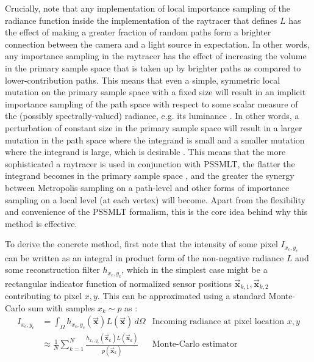 \documentclass[oneside, a4paper]{article}
\newcommand\vek[1]{\vec{\bm{#1}}}
\begin{document}
\begin{highlightblock}
Crucially, note that any implementation of local importance sampling of the radiance function inside the implementation of the raytracer that defines $L$ has the effect of making a greater fraction of random paths form a brighter connection between the camera and a light source in expectation. In other words, any importance sampling in the raytracer has the effect of increasing the volume in the primary sample space that is taken up by brighter paths as compared to lower-contribution paths. This means that even a simple, symmetric local mutation on the primary sample space with a fixed size will result in an implicit importance sampling of the path space with respect to some scalar measure of the (possibly spectrally-valued) radiance, e.g. its luminance \autocite{pssmlt}. In other words, a perturbation of constant size in the primary sample space will result in a larger mutation in the path space where the integrand is small and a smaller mutation where the integrand is large, which is desirable \autocite{pssmlt}. This means that the more sophisticated a raytracer is used in conjunction with PSSMLT, the flatter the integrand becomes in the primary sample space \autocite{mlt-auto-param}, and the greater the synergy between Metropolis sampling on a path-level and other forms of importance sampling on a local level (at each vertex) will become. Apart from the flexibility and convenience of the PSSMLT formalism, this is the core idea behind why this method is effective.
\end{highlightblock}

To derive the concrete method, first note that the intensity of some pixel $I_{x_c,y_c}$ can be written as an integral in product form of the non-negative radiance $L$ and some reconstruction filter $h_{x_c,y_c}$, which in the simplest case might be a rectangular indicator function of normalized sensor positions $\vek{x}_{k, 1}, \vek{x}_{k, 2}$ contributing to pixel $x,y$. This can be approximated using a standard Monte-Carlo sum with samples $x_k \sim p$ as \autocite{pbrt}:
\begin{align}
  I_{x_c,y_c} &= \int_{\Omega} h_{x_c,y_c}(\vek{x}) L(\vek{x}) \, d\Omega &\text{Incoming radiance at pixel location $x,y$}\\
  &\approx \frac{1}{N}\sum_{k=1}^{N} \frac{h_{x_c,y_c}(\vek{x}_k) L(\vek{x}_k)}{p(\vek{x}_k)} &\text{Monte-Carlo estimator}
\end{align}
\end{document}
